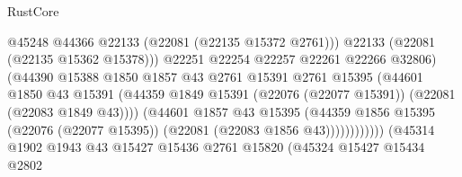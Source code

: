 \begin{lexlean}{RustCore}
\begin{coremodule}
                                                @45248
                                                @44366
                                                @22133
                                                (@22081 (@22135 @15372 @2761)))
                                              @22133
                                              (@22081 (@22135 @15362 @15378)))
                                            @22251
                                            @22254
                                            @22257
                                            @22261
                                            @22266
                                            @32806)
                                          (@44390
                                            @15388
                                            @1850
                                            @1857
                                            @43
                                            @2761
                                            @15391
                                            @2761
                                            @15395
                                            (@44601
                                              @1850
                                              @43
                                              @15391
                                              (@44359
                                                @1849
                                                @15391
                                                (@22076 (@22077 @15391))
                                                (@22081 (@22083 @1849 @43))))
                                            (@44601
                                              @1857
                                              @43
                                              @15395
                                              (@44359
                                                @1856
                                                @15395
                                                (@22076 (@22077 @15395))
                                                (@22081 (@22083 @1856 @43))))))))))))
                            (@45314
                              @1902
                              @1943
                              @43
                              @15427
                              @15436
                              @2761
                              @15820
                              (@45324
                                @15427
                                @15434
                                @2802

\end{coremodule}
\end{lexlean}
